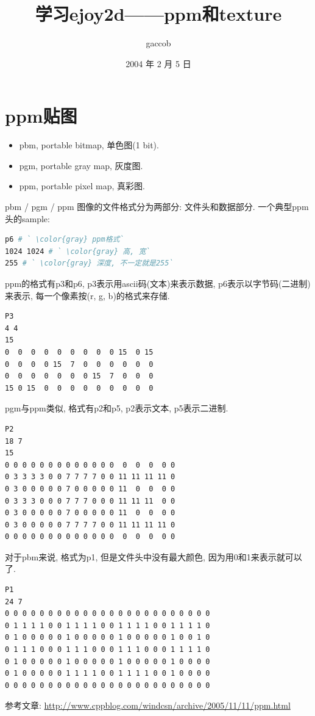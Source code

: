 

\title {\ZHH \huge 学习ejoy2d——ppm和texture}
\author {\small gaccob}
\date {\small 2004 年 2 月 5 日}
\maketitle

\section* {\ZHH \Large ppm贴图} {
    \begin {itemize}
    \item {pbm, portable bitmap, 单色图(1 bit). }
    \item {pgm, portable gray map, 灰度图. }
    \item {ppm, portable pixel map, 真彩图. }
    \end {itemize}\par

    {pbm / pgm / ppm 图像的文件格式分为两部分: 文件头和数据部分. 一个典型ppm头的sample: }\par
\begin{lstlisting}[language=bash]
p6 # ` \color{gray} ppm格式`
1024 1024 # ` \color{gray} 高, 宽`
255 # ` \color{gray} 深度, 不一定就是255`
\end{lstlisting}

    {ppm的格式有p3和p6, p3表示用ascii码(文本)来表示数据, p6表示以字节码(二进制)来表示, 每一个像素按(r, g, b)的格式来存储. }\par
\begin{lstlisting}[language=bash]
P3
4 4
15
0  0  0  0  0  0  0  0  0 15  0 15
0  0  0  0 15  7  0  0  0  0  0  0
0  0  0  0  0  0  0 15  7  0  0  0
15 0 15  0  0  0  0  0  0  0  0  0
\end{lstlisting}

    {pgm与ppm类似, 格式有p2和p5, p2表示文本, p5表示二进制.}\par
\begin{lstlisting}[language=bash]
P2
18 7
15
0 0 0 0 0 0 0 0 0 0 0 0 0  0  0  0  0 0
0 3 3 3 3 0 0 7 7 7 7 0 0 11 11 11 11 0
0 3 0 0 0 0 0 7 0 0 0 0 0 11  0  0  0 0
0 3 3 3 0 0 0 7 7 7 0 0 0 11 11 11  0 0
0 3 0 0 0 0 0 7 0 0 0 0 0 11  0  0  0 0
0 3 0 0 0 0 0 7 7 7 7 0 0 11 11 11 11 0
0 0 0 0 0 0 0 0 0 0 0 0 0  0  0  0  0 0
\end{lstlisting}

    {对于pbm来说, 格式为p1, 但是文件头中没有最大颜色, 因为用0和1来表示就可以了.}\par
\begin{lstlisting}[language=bash]
P1
24 7
0 0 0 0 0 0 0 0 0 0 0 0 0 0 0 0 0 0 0 0 0 0 0 0
0 1 1 1 1 0 0 1 1 1 1 0 0 1 1 1 1 0 0 1 1 1 1 0
0 1 0 0 0 0 0 1 0 0 0 0 0 1 0 0 0 0 0 1 0 0 1 0
0 1 1 1 0 0 0 1 1 1 0 0 0 1 1 1 0 0 0 1 1 1 1 0
0 1 0 0 0 0 0 1 0 0 0 0 0 1 0 0 0 0 0 1 0 0 0 0
0 1 0 0 0 0 0 1 1 1 1 0 0 1 1 1 1 0 0 1 0 0 0 0
0 0 0 0 0 0 0 0 0 0 0 0 0 0 0 0 0 0 0 0 0 0 0 0
\end{lstlisting}

    \par{参考文章: \href{http://www.cppblog.com/windcsn/archive/2005/11/11/ppm.html}{http://www.cppblog.com/windcsn/archive/2005/11/11/ppm.html}}
}

